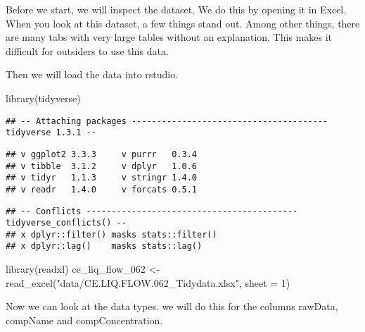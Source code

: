 \documentclass[
]{book}
\newenvironment{Shaded}{\begin{snugshade}}{\end{snugshade}}
\newcommand{\AttributeTok}[1]{\textcolor[rgb]{0.77,0.63,0.00}{#1}}
\newcommand{\DecValTok}[1]{\textcolor[rgb]{0.00,0.00,0.81}{#1}}
\newcommand{\FunctionTok}[1]{\textcolor[rgb]{0.00,0.00,0.00}{#1}}
\newcommand{\NormalTok}[1]{#1}
\newcommand{\OtherTok}[1]{\textcolor[rgb]{0.56,0.35,0.01}{#1}}
\newcommand{\SpecialCharTok}[1]{\textcolor[rgb]{0.00,0.00,0.00}{#1}}
\newcommand{\StringTok}[1]{\textcolor[rgb]{0.31,0.60,0.02}{#1}}
\begin{document}
Before we start, we will inspect the dataset. We do this by opening it in Excel. When you look at this dataset, a few things stand out. Among other things, there are many tabs with very large tables without an explanation. This makes it difficult for outsiders to use this data.

Then we will load the data into rstudio.

\begin{Shaded}
\begin{Highlighting}[]
\FunctionTok{library}\NormalTok{(tidyverse)}
\end{Highlighting}
\end{Shaded}

\begin{verbatim}
## -- Attaching packages --------------------------------------- tidyverse 1.3.1 --
\end{verbatim}

\begin{verbatim}
## v ggplot2 3.3.3     v purrr   0.3.4
## v tibble  3.1.2     v dplyr   1.0.6
## v tidyr   1.1.3     v stringr 1.4.0
## v readr   1.4.0     v forcats 0.5.1
\end{verbatim}

\begin{verbatim}
## -- Conflicts ------------------------------------------ tidyverse_conflicts() --
## x dplyr::filter() masks stats::filter()
## x dplyr::lag()    masks stats::lag()
\end{verbatim}

\begin{Shaded}
\begin{Highlighting}[]
\FunctionTok{library}\NormalTok{(readxl)}
\NormalTok{ce\_liq\_flow\_062 }\OtherTok{\textless{}{-}} \FunctionTok{read\_excel}\NormalTok{(}\StringTok{"data/CE.LIQ.FLOW.062\_Tidydata.xlsx"}\NormalTok{, }\AttributeTok{sheet =} \DecValTok{1}\NormalTok{)}
\end{Highlighting}
\end{Shaded}

Now we can look at the data types. we will do this for the columns rawData, compName and compConcentration.

\begin{Shaded}
\end{Shaded}
\end{document}
